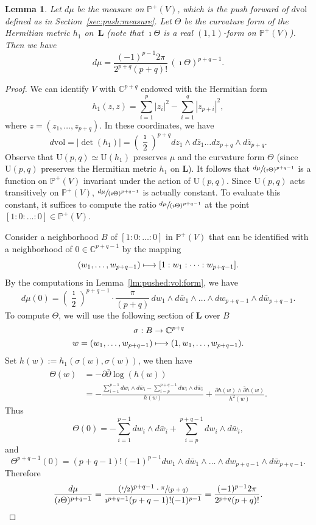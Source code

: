 \documentclass[10pt]{amsart}
\newcommand\mto{\mathchoice{\longmapsto}{\mapsto}{\mapsto}{\mapsto}}
\theoremstyle{plain}
\newtheorem{Lemma}[Theorem]{Lemma}
\theoremstyle{definition}
\def\C{\mathbb{C}}
\newcommand{\Pb}{\mathbb{P}}
\newcommand{\Lb}{\mathbf{L}}
\newcommand{\vol}{\mathrm{vol}}
\newcommand{\Ur}{\mathrm{U}}
\begin{document}
\begin{Lemma}\label{lm:vol:form:chern:curv}
Let $d\mu$ be the measure on $\Pb^+(V)$, which is the push forward of $d\vol$ defined as in Section~\ref{sec:push:measure}.
Let $\Theta$ be the curvature form of the Hermitian metric $h_1$ on~$\Lb$ (note that $\imath\Theta$ is a real $(1,1)$-form on $\Pb^+(V)$).
Then we have
\[
d\mu=\frac{(-1)^{p-1}2\pi}{2^{p+q}(p+q)!}\,(\imath\Theta)^{p+q-1}.
\]
\end{Lemma}
\begin{proof}
We can identify $V$ with $\C^{p+q}$ endowed with the Hermitian form
\[
h_1(z,z)=\sum_{i=1}^p |z_i|^2-\sum_{i=1}^q |z_{p+i}|^2,
\]
where $z=(z_1,\dots,z_{p+q})$. In these coordinates, we have
\[
d\vol=|{\det}(h_1)|=\left(\frac{\imath}{2}\right)^{p+q}dz_1\wedge d\bar{z}_1\dots dz_{p+q}\wedge d\bar{z}_{p+q}.
\]
Observe that $\Ur(p,q)\simeq \Ur(h_1)$ preserves $\mu$ and the curvature form $\Theta$ (since $\Ur(p,q)$ preserves the Hermitian metric $h_1$ on $\Lb$).
It follows that $\sfrac{d\mu}{(\imath\Theta)^{p+q-1}}$ is a function on $\Pb^+(V)$ invariant under the action of $\Ur(p,q)$.
Since $\Ur(p,q)$ acts transitively on $\Pb^+(V)$, $\sfrac{d\mu}{(\imath\Theta)^{p+q-1}}$ is actually constant.
To evaluate this constant, it suffices to compute the ratio $\sfrac{d\mu}{(\imath\Theta)^{p+q-1}}$ at the point $[1:0:\dots:0] \in \Pb^+(V)$.

Consider a neighborhood $B$ of $[1:0:\dots:0]$ in $\Pb^+(V)$ that can be identified with a neighborhood of $0\in \C^{p+q-1}$ by the mapping
\[
(w_1,\dots,w_{p+q-1}) \mto [1:w_1:\dots:w_{p+q-1}].
\]
By the computations in Lemma~\ref{lm:pushed:vol:form}, we have
\[
d\mu(0)=\left(\frac{\imath}{2}\right)^{p+q-1}\cdot\frac{\pi}{(p+q)}\,dw_1\wedge d\bar{w}_1\wedge\dots\wedge dw_{p+q-1}\wedge d\bar{w}_{p+q-1}.
\]
To compute $\Theta$, we will use the following section of $\Lb$ over $B$
\begin{align*}
\sigma: B & \to  \C^{p+q} \\
 w=(w_1,\dots,w_{p+q-1}) & \mto  (1,w_1,\dots,w_{p+q-1}).
\end{align*}
Set $h(w):=h_1(\sigma(w),\sigma(w))$, we then have
\begin{align*}
\Theta(w) &=  -\partial\bar{\partial}\log(h(w)) \\
& = -\frac{\sum_{i=1}^{p-1}dw_i\wedge d\bar{w}_i-\sum_{i=p}^{p+q-1}dw_i\wedge d\bar{w}_i}{h(w)} + \frac{\partial h(w)\wedge\bar{\partial}h(w)}{h^2(w)}.
\end{align*}
Thus
\[
\Theta(0)=-\sum_{i=1}^{p-1}dw_i\wedge d\bar{w}_i+\sum_{i=p}^{p+q-1}dw_i \wedge d\bar{w}_i,
\]
and
\[
\Theta^{p+q-1}(0)=(p+q-1)!(-1)^{p-1}dw_1\wedge d\bar{w}_1\wedge\dots\wedge dw_{p+q-1}\wedge d\bar{w}_{p+q-1}.
\]
Therefore
\[
\frac{d\mu}{(\imath\Theta)^{p+q-1}}= \frac{(\sfrac{\imath}{2})^{p+q-1}\cdot\sfrac{\pi}{(p+q)}}{\imath^{p+q-1} (p+q-1)!(-1)^{p-1}} = \frac{(-1)^{p-1}2\pi}{2^{p+q}(p+q)!}.\qedhere
\]
\end{proof}
\end{document}
